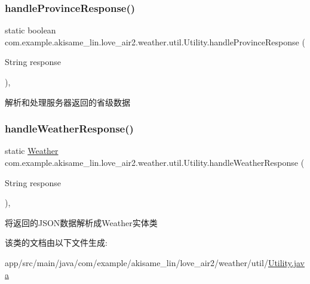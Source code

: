 \subsubsection{\texorpdfstring{handleProvinceResponse()}{handleProvinceResponse()}}
{\footnotesize\ttfamily static boolean com.\+example.\+akisame\+\_\+lin.\+love\+\_\+air2.\+weather.\+util.\+Utility.\+handle\+Province\+Response (\begin{DoxyParamCaption}\item[{String}]{response }\end{DoxyParamCaption})\hspace{0.3cm}{\ttfamily [inline]}, {\ttfamily [static]}}

解析和处理服务器返回的省级数据 \mbox{\label{classcom_1_1example_1_1akisame__lin_1_1love__air2_1_1weather_1_1util_1_1_utility_a67f669cea8b9ab2629d9ea6659b99ffd}} 
\subsubsection{\texorpdfstring{handleWeatherResponse()}{handleWeatherResponse()}}
{\footnotesize\ttfamily static \mbox{\hyperlink{classcom_1_1example_1_1akisame__lin_1_1love__air2_1_1weather_1_1gson_1_1_weather}{Weather}} com.\+example.\+akisame\+\_\+lin.\+love\+\_\+air2.\+weather.\+util.\+Utility.\+handle\+Weather\+Response (\begin{DoxyParamCaption}\item[{String}]{response }\end{DoxyParamCaption})\hspace{0.3cm}{\ttfamily [inline]}, {\ttfamily [static]}}

将返回的\+J\+S\+O\+N数据解析成\+Weather实体类 

该类的文档由以下文件生成\+:\begin{DoxyCompactItemize}
\item 
app/src/main/java/com/example/akisame\+\_\+lin/love\+\_\+air2/weather/util/\mbox{\hyperlink{java_2com_2example_2akisame__lin_2love__air2_2weather_2util_2_utility_8java}{Utility.\+java}}\end{DoxyCompactItemize}
